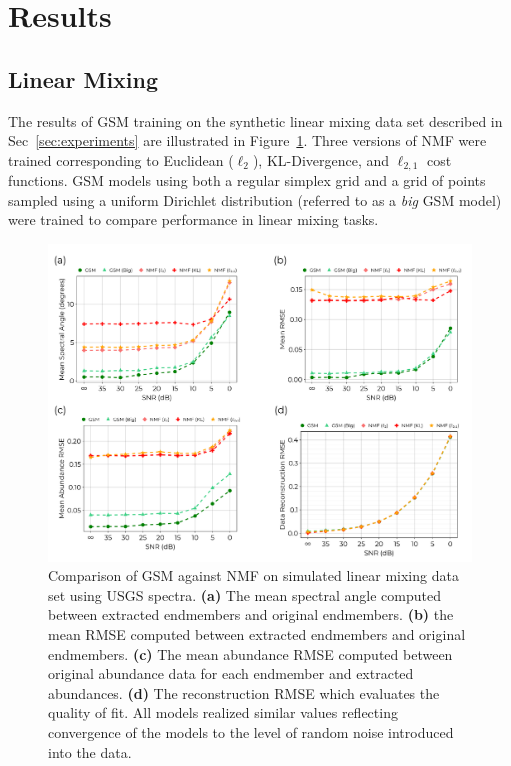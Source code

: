 \documentclass[remotesensing,article,submit,pdftex,moreauthors]{Definitions/mdpi}
\begin{document}
\section{Results}\label{sec:results}
\subsection{Linear Mixing}

The results of GSM training on the synthetic linear mixing data set described in Sec~\ref{sec:experiments} are illustrated in Figure~\ref{fig:usgs-fits}. Three versions of NMF were trained corresponding to Euclidean ($\ell_2$), KL-Divergence, and $\ell_{2,1}$ cost functions. GSM models using both a regular simplex grid and a grid of points sampled using a uniform Dirichlet distribution (referred to as a \textit{big} GSM model) were trained to compare performance in linear mixing tasks.

\begin{figure}[H]
\includegraphics[width=\columnwidth]{results/usgs/fit-comparison.pdf}
\caption{Comparison of GSM against NMF on simulated linear mixing data set using USGS spectra. \textbf{(a)} The mean spectral angle computed between extracted endmembers and original endmembers. \textbf{(b)} the mean RMSE computed between extracted endmembers and original endmembers. \textbf{(c)} The mean abundance RMSE computed between original abundance data for each endmember and extracted abundances. \textbf{(d)} The reconstruction RMSE which evaluates the quality of fit. All models realized similar values reflecting convergence of the models to the level of random noise introduced into the data.}
 \label{fig:usgs-fits}
\end{figure}  
\end{document}
